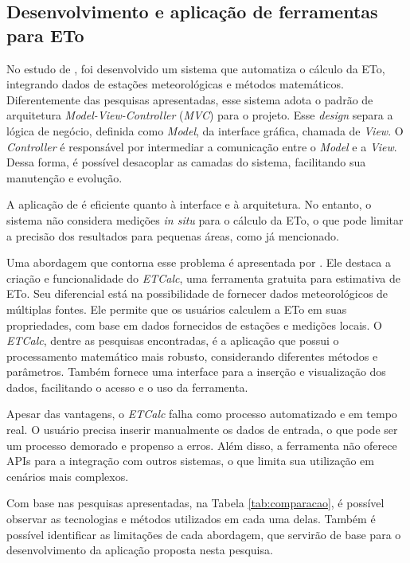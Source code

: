 \subsection{Desenvolvimento e aplicação de ferramentas para ETo}
No estudo de \textcite{Taison_webeva2019}, foi desenvolvido um sistema que automatiza o cálculo da ETo, integrando dados de estações meteorológicas e métodos matemáticos. Diferentemente das pesquisas apresentadas, esse sistema adota o padrão de arquitetura \textit{Model-View-Controller} (\textit{MVC}) para o projeto. Esse \textit{design} separa a lógica de negócio, definida como \textit{Model}, da interface gráfica, chamada de \textit{View}. O \textit{Controller} é responsável por intermediar a comunicação entre o \textit{Model} e a \textit{View}. Dessa forma, é possível desacoplar as camadas do sistema, facilitando sua manutenção e evolução.

A aplicação de \textcite{Taison_webeva2019} é eficiente quanto à interface e à arquitetura. No entanto, o sistema não considera medições \textit{in situ} para o cálculo da ETo, o que pode limitar a precisão dos resultados para pequenas áreas, como já mencionado. 

Uma abordagem que contorna esse problema é apresentada por \textcite{Serban_webeva2022}. Ele destaca a criação e funcionalidade do \textit{ETCalc}, uma ferramenta gratuita para estimativa de ETo. Seu diferencial está na possibilidade de fornecer dados meteorológicos de múltiplas fontes. Ele permite que os usuários calculem a ETo em suas propriedades, com base em dados fornecidos de estações e medições locais. O \textit{ETCalc}, dentre as pesquisas encontradas, é a aplicação que possui o processamento matemático mais robusto, considerando diferentes métodos e parâmetros. Também fornece uma interface para a inserção e visualização dos dados, facilitando o acesso e o uso da ferramenta.

Apesar das vantagens, o \textit{ETCalc} falha como processo automatizado e em tempo real. O usuário precisa inserir manualmente os dados de entrada, o que pode ser um processo demorado e propenso a erros. Além disso, a ferramenta não oferece APIs para a integração com outros sistemas, o que limita sua utilização em cenários mais complexos.

Com base nas pesquisas apresentadas, na Tabela \ref{tab:comparacao}, é possível observar as tecnologias e métodos utilizados em cada uma delas. Também é possível identificar as limitações de cada abordagem, que servirão de base para o desenvolvimento da aplicação proposta nesta pesquisa.

